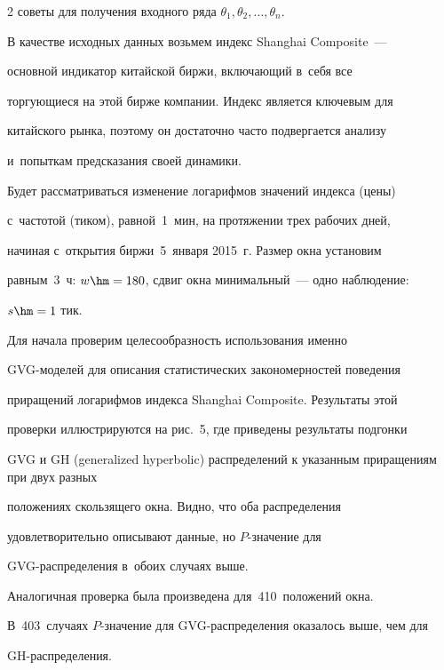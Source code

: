 \begin{multicols}{2}
советы для получения входного ряда $\theta_1, \theta_2, \ldots,


\theta_n$.





В качестве исходных данных возьмем индекс Shanghai Composite~---


основной индикатор китайской биржи, включающий в~себя все


торгующиеся на этой бирже компании. Индекс является ключевым для


китайского рынка, поэтому он достаточно часто подвергается анализу 


и~попыткам предсказания своей динамики.





Будет рассматриваться изменение логарифмов значений индекса (цены) 


с~частотой (тиком), равной~1~мин, на протяжении трех рабочих дней,


начиная с~открытия биржи~5~января 2015~г. Размер окна установим


равным~3~ч: $w\hm=180$, сдвиг окна минимальный~--- одно наблюдение:


$s\hm=1$ тик.





Для начала проверим целесообразность использования именно


GVG-моделей для описания статистических закономерностей поведения


при\-ра\-щений логарифмов индекса Shanghai Composite. Результаты этой


проверки иллюстрируются на рис.~5, где приведены результаты подгонки


GVG и GH (generalized hyperbolic) рас\-пре\-де\-ле\-ний к указанным приращениям при двух разных


положениях скользящего окна. Видно, что оба распределения


удовлетворительно описывают данные, но $P$-зна\-че\-ние для


GVG-рас\-пре\-де\-ле\-ния в~обоих случаях выше.


Аналогичная проверка была произведена для~410~положений окна. 


В~403~случаях $P$-зна\-че\-ние для GVG-рас\-пре\-де\-ле\-ния оказалось выше, чем для


GH-рас\-пре\-де\-ления.


















\end{multicols}
